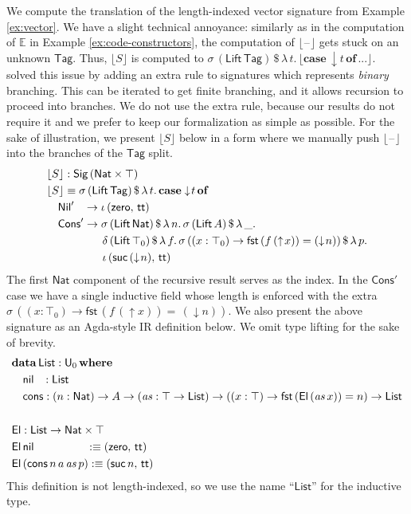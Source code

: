 \documentclass[acmsmall,screen,review]{acmart}
\newcommand{\mit}[1]{{\mathit{#1}}}
\newcommand{\msf}[1]{{\mathsf{#1}}}
\newcommand{\mbf}[1]{{\mathbf{#1}}}
\newcommand{\mbb}[1]{\mathbb{#1}}
\newcommand{\data}{\mbf{data}}
\newcommand{\U}{\msf{U}}
\newcommand{\where}{\mbf{where}}
\newcommand{\Nat}{\msf{Nat}}
\newcommand{\zero}{\msf{zero}}
\newcommand{\suc}{\msf{suc}}
\newcommand{\Nil}{\msf{Nil}}
\newcommand{\Cons}{\msf{Cons}}
\newcommand{\List}{\msf{List}}
\newcommand{\El}{\msf{El}}
\newcommand{\Lift}{\msf{Lift}}
\newcommand{\lup}{\uparrow}
\newcommand{\ldown}{\downarrow}
\newcommand{\Sig}{\msf{Sig}}
\newcommand{\Tag}{\msf{Tag}}
\newcommand{\case}{\mbf{case}}
\newcommand{\of}{\mbf{of}}
\newcommand{\ttt}{\msf{tt}}
\newcommand{\blank}{{\mathord{\hspace{1pt}\text{--}\hspace{1pt}}}}
\newcommand{\fst}{\msf{fst}}
\newcommand{\floord}[1]{\lfloor #1 \rfloor}
\newcommand{\nil}{\msf{nil}}
\newcommand{\cons}{\msf{cons}}
\newcommand{\E}{\mbb{E}}
\begin{document}
\begin{example} \label{ex:ir-vector}
We compute the translation of the length-indexed vector signature from Example \ref{ex:vector}. We
have a slight technical annoyance: similarly as in the computation of $\E$ in Example
\ref{ex:code-constructors}, the computation of $\floord{\blank}$ gets stuck on an unknown
$\Tag$. Thus, $\floord{S}$ is computed to
$\sigma\,(\Lift\,\Tag)\,\$\,\lambda\,t.\,\floord{\case\,\ldown\!t\,\of\,...}$. \citet{whynotw}
solved this issue by adding an extra rule to signatures which represents \emph{binary}
branching. This can be iterated to get finite branching, and it allows recursion to proceed into
branches. We do not use the extra rule, because our results do not require it and we prefer to keep
our formalization as simple as possible. For the sake of illustration, we present $\floord{S}$ below
in a form where we manually push $\floord{\blank}$ into the branches of the $\Tag$ split.
\begin{alignat*}{4}
  & \floord{S} : \Sig\,(\Nat \times \top)\\
  & \floord{S} \equiv \sigma\,(\Lift\,\Tag)\,\$\,\lambda\,t.\,\case \ldown\!t\,\of \\
  & \quad \Nil'\hspace{0.85em} \to \iota\,(\zero,\,\ttt) \\
  & \quad \Cons'\to \sigma\,(\Lift\,\Nat)\,\$\,\lambda\,n.\,\sigma\,(\Lift\,A)\,\$\,\lambda\,\_.\\
  & \quad \hspace{4em}  \delta\,(\Lift\,\top_0)\,\$\,\lambda\,f.\,\sigma\,((x : \top_0) \to \fst\,(f\,(\lup\!x)) = (\ldown\!n))\,\$\,\lambda\,p.\\
  & \quad \hspace{4em}  \iota\,(\suc\,(\ldown\!n),\,\ttt)
\end{alignat*}
The first $\Nat$ component of the recursive result serves as the index. In the $\Cons'$ case we have
a single inductive field whose length is enforced with the extra $\sigma\,((x : \top_0) \to
\fst\,(f\,(\lup\!x)) =\,(\ldown\!n))$. We also present the above signature as an Agda-style IR
definition below. We omit type lifting for the sake of brevity.
\begin{alignat*}{4}
  & \data\,\List : \U_0\,\where\\
  & \quad \nil \hspace{0.78em} : \List\\
  & \quad \cons : (n : \Nat) \to A \to (\mit{as} : \top \to \List) \to ((x : \top) \to \fst\,(\El\,(\mit{as}\,x)) = n) \to \List\\
  & \\
  & \El : \List \to \Nat \times \top\\
  & \El\,\nil \hspace{4.7em}:\equiv (\zero,\,\ttt)\\
  & \El\,(\cons\,n\,a\,\mit{as}\,p) :\equiv (\suc\,n,\,\ttt)
\end{alignat*}
This definition is not length-indexed, so we use the name ``$\List$'' for the inductive type.
\end{example}
\end{document}
